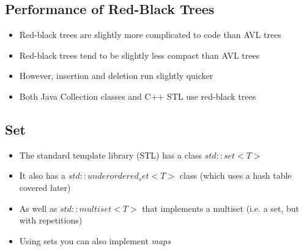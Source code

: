 
\begin{slide}
\section{Performance of Red-Black Trees}

\begin{PauseHighLight}
  \begin{itemize}
  \item Red-black trees are slightly more complicated to code than AVL
    trees\pause 
  \item Red-black trees tend to be slightly less compact than AVL
    trees\pause
  \item However, insertion and deletion run slightly quicker\pause
  \item Both Java Collection classes and C++ STL use red-black
    trees\pause
  \end{itemize}
\end{PauseHighLight}

\end{slide}



\begin{slide}
\section{Set}

\begin{PauseHighLight}
  \begin{itemize}
  \item The standard template library (STL) has a class
    \jl$std::set<T>$\pause
  \item It also has a \jl$std::underordered_set<T>$ class (which uses a
    hash table covered later)\pause
  \item As well as \jl$std::multiset<T>$ that implements a multiset
    (i.e. a set, but with repetitions)\pause
  \item Using sets you can also implement \emph{maps}\pause
  \end{itemize}
\end{PauseHighLight}

\end{slide}


